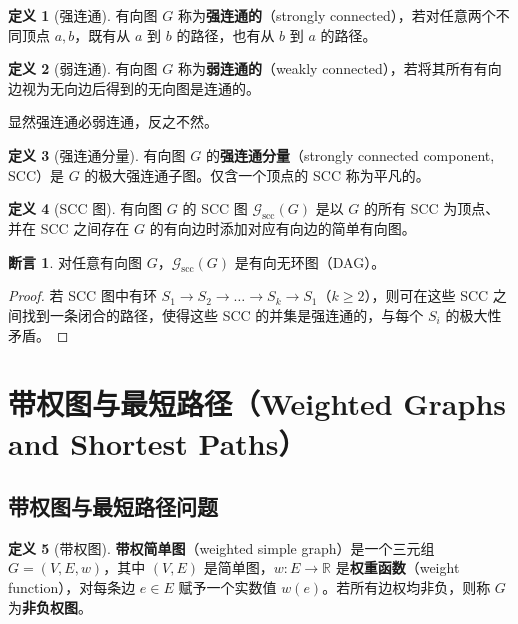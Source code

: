 \documentclass[UTF8,11pt,a4paper]{ctexbook}   %
\theoremstyle{definition}
\newtheorem{definition}{定义}[section]
\newtheorem{proposition}{断言}[section]
\begin{document}
\begin{definition}[强连通]
有向图 $G$ 称为\textbf{强连通的}（strongly connected），若对任意两个不同顶点 $a,b$，既有从 $a$ 到 $b$ 的路径，也有从 $b$ 到 $a$ 的路径。
\end{definition}

\begin{definition}[弱连通]
有向图 $G$ 称为\textbf{弱连通的}（weakly connected），若将其所有有向边视为无向边后得到的无向图是连通的。
\end{definition}

显然强连通必弱连通，反之不然。

\begin{definition}[强连通分量]
有向图 $G$ 的\textbf{强连通分量}（strongly connected component, SCC）是 $G$ 的极大强连通子图。仅含一个顶点的 SCC 称为平凡的。
\end{definition}

\begin{definition}[SCC 图]
有向图 $G$ 的 SCC 图 $\mathcal{G}_{\mathrm{scc}}(G)$ 是以 $G$ 的所有 SCC 为顶点、并在 SCC 之间存在 $G$ 的有向边时添加对应有向边的简单有向图。
\end{definition}

\begin{proposition}
对任意有向图 $G$，$\mathcal{G}_{\mathrm{scc}}(G)$ 是有向无环图（DAG）。
\end{proposition}

\begin{proof}
若 SCC 图中有环 $S_1 \to S_2 \to \dots \to S_k \to S_1$（$k \geq 2$），则可在这些 SCC 之间找到一条闭合的路径，使得这些 SCC 的并集是强连通的，与每个 $S_i$ 的极大性矛盾。
\end{proof}

\section{带权图与最短路径（Weighted Graphs and Shortest Paths）}

\subsection{带权图与最短路径问题}

\begin{definition}[带权图]
\textbf{带权简单图}（weighted simple graph）是一个三元组 $G=(V,E,w)$，其中 $(V,E)$ 是简单图，$w:E\to\mathbb{R}$ 是\textbf{权重函数}（weight function），对每条边 $e\in E$ 赋予一个实数值 $w(e)$。若所有边权均非负，则称 $G$ 为\textbf{非负权图}。
\end{definition}
\end{document}
